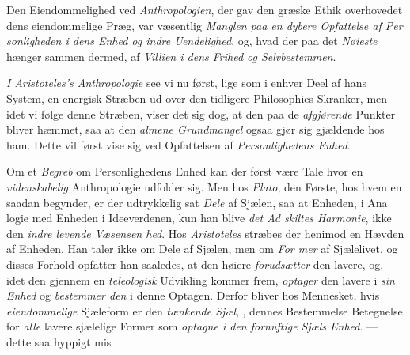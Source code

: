 Den Eiendommelighed ved \emph{Anthropologien}, der gav
den græske Ethik overhovedet dens eiendommelige Præg, var
væsentlig \emph{Manglen paa en dybere Opfattelse af Per\-%
sonligheden i dens Enhed og indre Uendelighed}, og,
 hvad der paa det \emph{Nøieste} hænger sammen dermed, af \emph{Villien
i dens Frihed og Selvbestemmen}.

\emph{I Aristoteles's Anthropologie} see vi nu først, lige\-%
som i enhver Deel af hans System, en energisk Stræben ud
over den tidligere Philosophies Skranker, men idet vi følge
denne Stræben, viser det sig dog, at den paa de \emph{afgjørende}
Punkter bliver hæmmet, saa at den \emph{almene Grundmangel}
ogsaa gjør sig gjældende hos ham. Dette vil først vise sig
ved Opfattelsen af \emph{Personlighedens Enhed}.

Om et \emph{Begreb} om Personlighedens Enhed kan der først
være Tale hvor en \emph{videnskabelig} Anthropologie udfolder sig.
Men hos \emph{Plato}, den Første, hos hvem en saadan begynder,
er der udtrykkelig sat \emph{Dele} af Sjælen, saa at Enheden, i Ana\-%
logie med Enheden i Ideeverdenen, kun han blive \emph{det Ad\-%
skiltes Harmonie}, ikke den \emph{indre levende Væsensen\-%
hed}. Hos \emph{Aristoteles} stræbes der henimod en Hævden af
Enheden. Han taler ikke om Dele af Sjælen, men om \emph{For\-%
mer} af Sjælelivet, og disses Forhold opfatter han saaledes, at
den høiere \emph{forudsætter} den lavere, og, idet den gjennem en
\emph{teleologisk} Udvikling kommer frem, \emph{optager} den lavere i
\emph{sin Enhed} og \emph{bestemmer den} i denne Optagen. Derfor
bliver hos Mennesket, hvis \emph{eiendommelige} Sjæleform er den
\emph{tænkende Sjæl}, , dennes Bestemmelse Betegnelse for
\emph{alle} lavere sjælelige Former som \emph{optagne i den fornuftige
Sjæls Enhed}. \emph{} --- dette saa hyppigt mis\-%

